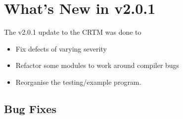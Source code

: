 \chapter*{What's New in v2.0.1}

The v2.0.1 update to the CRTM was done to
\begin{itemize}
  \item Fix defects of varying severity
  \item Refactor some modules to work around compiler bugs
  \item Reorganise the testing/example program.
\end{itemize}

\section*{Bug Fixes}

